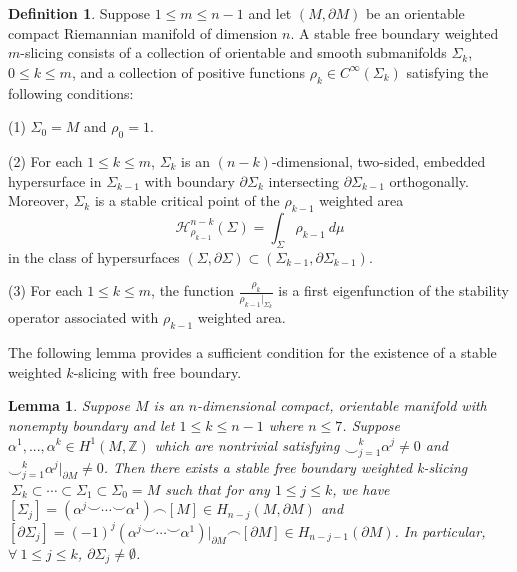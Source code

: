 \documentclass[11pt,letterpaper]{amsart}
\newtheorem{lemma}[theorem]{Lemma}
\theoremstyle{definition}
\newtheorem{definition}[theorem]{Definition}
\theoremstyle{remark}
\numberwithin{equation}{section}
\begin{document}
\begin{definition}
Suppose $1\leq m\leq n-1$ and let $(M,\partial M)$ be an orientable compact Riemannian manifold of dimension $n$. A stable free boundary weighted $m$-slicing consists of a collection of orientable and smooth submanifolds $\Sigma_{k}$, $0\leq k \leq m$, and a collection of positive functions $\rho_{k}\in C^{\infty}(\Sigma_{k})$ satisfying the following conditions:

(1) $\Sigma_{0}=M$ and $\rho_{0}=1$.

(2) For each $1\leq k\leq m$, $\Sigma_{k}$ is an $(n-k)$-dimensional, two-sided, embedded hypersurface in $\Sigma_{k-1}$ with boundary $\partial\Sigma_k$ intersecting $\partial\Sigma_{k-1}$ orthogonally. Moreover, $\Sigma_{k}$ is a stable critical point of the $\rho_{k-1}$ weighted area
\[
    \mathcal{H}_{\rho_{k-1}}^{n-k}(\Sigma) = \int_{\Sigma}\rho_{k-1}\ d\mu
\]
in the class of hypersurfaces $(\Sigma,\partial\Sigma)\subset (\Sigma_{k-1},\partial\Sigma_{k-1})$.

(3) For each $1\leq k\leq m$, the function $\frac{\rho_{k}}{\rho_{k-1}|_{\Sigma_{k}}}$ is a first eigenfunction of the stability operator associated with $\rho_{k-1}$ weighted area.
\end{definition}

The following lemma provides a sufficient condition for the existence of a stable weighted $k$-slicing with free boundary.

\begin{lemma}\label{existence of slicing}
    Suppose $M$ is an $n$-dimensional compact, orientable manifold with nonempty boundary and let $1\leq k\leq n-1$ where $n\leq 7$. Suppose $\alpha^{1},...,\alpha ^{k}\in H^{1}(M,\mathbb{Z})$ which are nontrivial satisfying  $\smile_{j=1}^{k}\alpha^{j}\neq 0$ and $\smile_{j=1}^{k}\alpha^{j}|_{\partial M}\neq 0$. Then there exists a stable free boundary weighted k-slicing $ \ \Sigma_{k}\subset \cdots\subset \Sigma_{1}\subset\Sigma_{0}=M$ such that for any $1\leq j\leq k$, we have $[\Sigma_{j}]=(\alpha^{j}\smile\cdots\smile \alpha^{1} )\frown [M]\in H_{n-j}(M,\partial M)$ and $[\partial \Sigma_{j}]=(-1)^{j}(\alpha^{j}\smile \cdots\smile \alpha^{1} )|_{\partial M}\frown [\partial M]\in H_{n-j-1}(\partial M)$. In particular, $\forall\ 1\leq j\leq k$, $\partial \Sigma_{j}\neq \emptyset$. 
\end{lemma}

\end{document}

